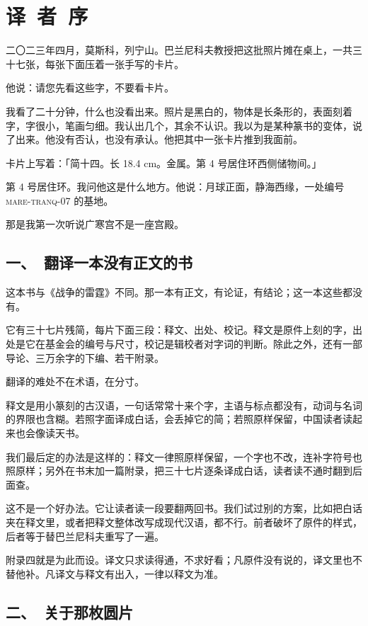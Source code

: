 \clearpage
\chapter*{译\ 者\ 序}

二〇二三年四月，莫斯科，列宁山。巴兰尼科夫教授把这批照片摊在桌上，一共三十七张，每张下面压着一张手写的卡片。

他说：请您先看这些字，不要看卡片。

我看了二十分钟，什么也没看出来。照片是黑白的，物体是长条形的，表面刻着字，字很小，笔画匀细。我认出几个，其余不认识。我以为是某种篆书的变体，说了出来。他没有否认，也没有承认。他把其中一张卡片推到我面前。

卡片上写着：「简十四。长 18.4 cm。金属。第 4 号居住环西侧储物间。」

第 4 号居住环。我问他这是什么地方。他说：月球正面，静海西缘，一处编号 \textsc{mare-tranq-07} 的基地。

那是我第一次听说广寒宫不是一座宫殿。

\section*{一、\ 翻译一本没有正文的书}

这本书与《战争的雷霆》不同。那一本有正文，有论证，有结论；这一本这些都没有。

它有三十七片残简，每片下面三段：释文、出处、校记。释文是原件上刻的字，出处是它在基金会的编号与尺寸，校记是辑校者对字词的判断。除此之外，还有一部导论、三万余字的下编、若干附录。

翻译的难处不在术语，在分寸。

释文是用小篆刻的古汉语，一句话常常十来个字，主语与标点都没有，动词与名词的界限也含糊。若照字面译成白话，会丢掉它的简；若照原样保留，中国读者读起来也会像读天书。

我们最后定的办法是这样的：释文一律照原样保留，一个字也不改，连补字符号也照原样；另外在书末加一篇附录，把三十七片逐条译成白话，读者读不通时翻到后面查。

这不是一个好办法。它让读者读一段要翻两回书。我们试过别的方案，比如把白话夹在释文里，或者把释文整体改写成现代汉语，都不行。前者破坏了原件的样式，后者等于替巴兰尼科夫重写了一遍。

附录四就是为此而设。译文只求读得通，不求好看；凡原件没有说的，译文里也不替他补。凡译文与释文有出入，一律以释文为准。

\section*{二、\ 关于那枚圆片}

